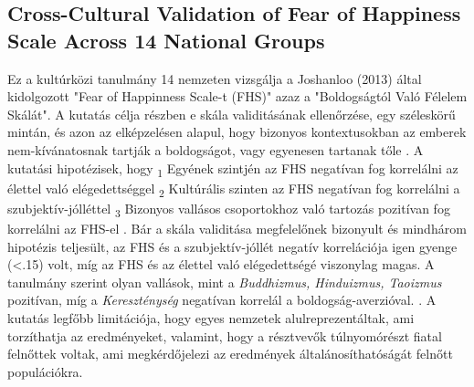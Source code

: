 \subsection{Cross-Cultural Validation of
	Fear of Happiness Scale Across 14 National Groups \cite{joshanloo_lepshokova_panyusheva_natalia_poon_yeung_sundaram_achoui_asano_igarashi}}
Ez a kultúrközi tanulmány 14 nemzeten vizsgálja a Joshanloo (2013) által kidolgozott "Fear of Happinness Scale-t (FHS)" azaz a "Boldogságtól Való Félelem Skálát". A kutatás célja részben e skála validitásának ellenőrzése, egy széleskörű mintán, és azon az elképzelésen alapul, hogy bizonyos kontextusokban az emberek nem-kívánatosnak tartják a boldogságot, vagy egyenesen tartanak tőle \cite{joshanloo_lepshokova_panyusheva_natalia_poon_yeung_sundaram_achoui_asano_igarashi}. A kutatási hipotézisek, hogy \textsubscript{1} Egyének szintjén az FHS negatívan fog korrelálni az élettel való elégedettséggel \textsubscript{2} Kultúrális szinten az FHS negatívan fog korrelálni a szubjektív-jólléttel \textsubscript{3} Bizonyos vallásos csoportokhoz való tartozás pozitívan fog korrelálni az FHS-el \cite{joshanloo_lepshokova_panyusheva_natalia_poon_yeung_sundaram_achoui_asano_igarashi}. Bár a skála validitása megfelelőnek bizonyult és mindhárom hipotézis teljesült, az FHS és a szubjektív-jóllét negatív korrelációja igen gyenge (\textless.15) volt, míg az FHS és az élettel való elégedettségé viszonylag magas. A tanulmány szerint olyan vallások, mint a \textit{Buddhizmus, Hinduizmus, Taoizmus} pozitívan, míg a \textit{Kereszténység} negatívan korrelál a boldogság-averzióval. \cite{joshanloo_lepshokova_panyusheva_natalia_poon_yeung_sundaram_achoui_asano_igarashi}. A kutatás legfőbb limitációja, hogy egyes nemzetek alulreprezentáltak, ami torzíthatja az eredményeket, valamint, hogy a résztvevők túlnyomórészt fiatal felnőttek voltak, ami megkérdőjelezi az eredmények általánosíthatóságát felnőtt populációkra.





